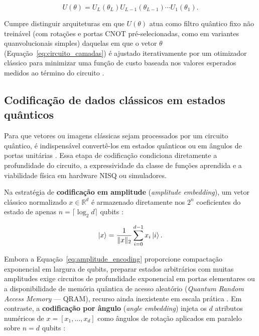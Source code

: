 \documentclass[
    12pt,
    openright,
    oneside,
    a4paper,
    english,
    brazil
]{abntex2}
\begin{document}
\begin{equation}
\label{eq:circuito_camadas}
U(\theta) =
U_L(\theta_L)
U_{L-1}(\theta_{L-1})
\cdots
U_1(\theta_1).
\end{equation}

Cumpre distinguir arquiteturas em que \(U(\theta)\) atua como filtro quântico fixo não treinável (com rotações e portas CNOT pré-selecionadas, como em variantes quanvolucionais simples) daquelas em que o vetor \(\theta\) (Equação~\eqref{eq:circuito_camadas}) é ajustado iterativamente por um otimizador clássico para minimizar uma função de custo baseada nos valores esperados medidos ao término do circuito \cite{cerezo2021variational}.

\subsection{Codificação de dados clássicos em estados quânticos}

Para que vetores ou imagens clássicas sejam processados por um circuito quântico, é indispensável convertê-los em estados quânticos ou em ângulos de portas unitárias \cite{schuld2021effect}. Essa etapa de codificação condiciona diretamente a profundidade do circuito, a expressividade da classe de funções aprendida e a viabilidade física em hardware NISQ ou simuladores.

Na estratégia de \textbf{codificação em amplitude} (\textit{amplitude embedding}), um vetor clássico normalizado \(x \in \mathbb{R}^d\) é armazenado diretamente nos \(2^n\) coeficientes do estado de apenas \(n = \lceil \log_2 d \rceil\) qubits \cite{schuld2021effect}:

\begin{equation}
\label{eq:amplitude_encoding}
\ket{x} = \frac{1}{\|x\|_2}\sum_{i=0}^{d-1} x_i \ket{i}.
\end{equation}

Embora a Equação~\eqref{eq:amplitude_encoding} proporcione compactação exponencial em largura de qubits, preparar estados arbitrários com muitas amplitudes exige circuitos de profundidade exponencial em portas elementares ou a disponibilidade de memória quântica de acesso aleatório (\textit{Quantum Random Access Memory} --- QRAM), recurso ainda inexistente em escala prática \cite{biamonte2017qml,schuld2021effect}. Em contraste, a \textbf{codificação por ângulo} (\textit{angle embedding}) injeta os \(d\) atributos numéricos de \(x = [x_1, \dots, x_d]\) como ângulos de rotação aplicados em paralelo sobre \(n = d\) qubits \cite{schuld2021effect}:
\end{document}
